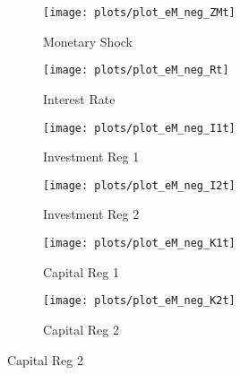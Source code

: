 \documentclass[../thesis.tex]{subfiles}
\begin{document}

\begin{figure}[h!]
	\centering
	\caption{Negative-Monetary-Shock Impulse Response Functions}
	\begin{subfigure}[b]{0.27\textwidth}
		\centering
		\texttt{[image: plots/plot\_eM\_neg\_ZMt]}
		\caption{\scriptsize Monetary Shock}
		\label{fig:eM-neg-ZMt}
	\end{subfigure}
	\hspace*{0.5cm}
	\begin{subfigure}[b]{0.27\textwidth}
		\centering
		\texttt{[image: plots/plot\_eM\_neg\_Rt]}
		\caption{\scriptsize Interest Rate}
		\label{fig:eM-neg-Rt}
	\end{subfigure}
	\hspace*{0.5cm}
	\begin{subfigure}[b]{0.27\textwidth}
		\centering
		\texttt{[image: plots/plot\_eM\_neg\_I1t]}
		\caption{\scriptsize Investment Reg 1}
		\label{fig:eM-neg-I1t}
	\end{subfigure}
	\vspace*{0.1cm}
	\begin{subfigure}[b]{0.27\textwidth}
		\centering
		\texttt{[image: plots/plot\_eM\_neg\_I2t]}
		\caption{\scriptsize Investment Reg 2}
		\label{fig:eM-neg-I2t}
	\end{subfigure}
	\hspace*{0.5cm}
	\begin{subfigure}[b]{0.27\textwidth}
		\centering
		\texttt{[image: plots/plot\_eM\_neg\_K1t]}
		\caption{\scriptsize Capital Reg 1}
		\label{fig:eM-neg-K1t}
	\end{subfigure}
	\hspace*{0.5cm}
	\begin{subfigure}[b]{0.27\textwidth}
		\centering
		\texttt{[image: plots/plot\_eM\_neg\_K2t]}
		\caption{\scriptsize Capital Reg 2}

\end{subfigure}
\end{figure}
\end{document}
